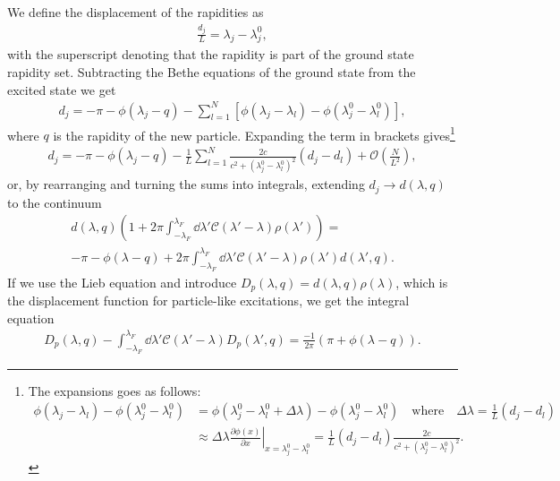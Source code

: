 \documentclass[11pt, a4paper]{report} %
\begin{document}
We define the displacement of the rapidities as~\cite{Caux2015}
\begin{align}
  \label{eq:24}
  \frac{d_j}{L} = \lambda_j - \lambda_j^0,
\end{align}
with the superscript denoting that the rapidity is part of the ground state rapidity set.
Subtracting the Bethe equations of the ground state from the excited state we get~\cite{Franchini2017,Caux2015}
\begin{align}
  \label{eq:25}
   d_j = - \pi - \phi(\lambda_j-q) - \sum_{l=1}^{N} \left[\phi(\lambda_j - \lambda_l) - \phi(\lambda_j^0-\lambda_l^0)\right],
\end{align}
where \(q\) is the rapidity of the new particle.
Expanding the term in brackets gives\footnote{The expansions goes as follows:
  \begin{align*}
    \phi(\lambda_j-\lambda_l) - \phi(\lambda_j^0 - \lambda_l^0) &= \phi(\lambda_j^0 - \lambda_l^0 + \Delta\lambda) - \phi(\lambda_j^0 - \lambda_l^0) \quad \mathrm{where}\quad \Delta \lambda = \frac{1}{L}(d_j - d_l)\\
    &\approx\Delta \lambda \left.\frac{\partial\phi(x)}{\partial x} \right|_{x = \lambda_j^0-\lambda_l^0}
    = \frac{1}{L}(d_j-d_l) \frac{2c}{c^2 + (\lambda_j^0-\lambda_l^0)^2}.
  \end{align*}
}
\begin{align}
  \label{eq:27}
  d_j = -\pi - \phi(\lambda_j-q) - \frac{1}{L} \sum_{l=1}^N \frac{2c}{c^2 + (\lambda_j^0-\lambda_l^0)^2} (d_j-d_l) + \mathcal{O}\left(\frac{N}{L^2}\right),
\end{align}
or, by rearranging and turning the sums into integrals, extending \(d_j\to d(\lambda,q)\) to the continuum
\begin{multline}
  \label{eq:28}
  d(\lambda,q) \left(1+2\pi \int_{-\lambda_F}^{\lambda_F} \dd \lambda'\mathcal{C}(\lambda'-\lambda)\rho(\lambda')\right) = \\-\pi -\phi(\lambda-q) + 2\pi \int_{-\lambda_F}^{\lambda_F} \dd \lambda' \mathcal{C}(\lambda'-\lambda) \rho(\lambda') d(\lambda',q).
\end{multline}
If we use the Lieb equation and introduce \(D_p(\lambda,q)=d(\lambda,q)\rho(\lambda)\), which is the displacement function for particle-like excitations, we get the integral equation~\cite{Caux2015,Franchini2017}
\begin{align}
  \label{eq:partdisplacement}
  D_p(\lambda,q) - \int_{-\lambda_F}^{\lambda_F} \dd \lambda' \mathcal{C}(\lambda'-\lambda) D_p(\lambda', q) = \frac{-1}{2\pi} (\pi+\phi(\lambda-q)).
\end{align}
\end{document}
